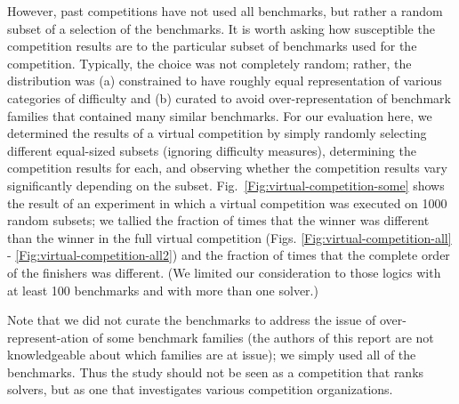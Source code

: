 \documentclass[smallcondensed]{svjour3}
\begin{document}
However, past competitions have not used all benchmarks, but rather a random subset of a selection of the benchmarks. It is worth asking how susceptible the competition results are to the particular subset of benchmarks used for the competition. Typically, the choice was not completely random; rather, the distribution was (a) constrained to have roughly equal representation of various categories of difficulty and (b) curated to avoid over-representation of benchmark families that contained many similar benchmarks. For our evaluation here, we determined the results of a virtual competition by simply randomly selecting different equal-sized subsets (ignoring difficulty measures), determining the competition results for each, and observing whether the competition results vary significantly depending on the subset.  Fig.~\ref{Fig:virtual-competition-some} shows the result of an experiment in which a virtual competition was executed on 1000 random subsets; we tallied the fraction of times that the winner was different than the winner in the full virtual competition (Figs. \ref{Fig:virtual-competition-all} - \ref{Fig:virtual-competition-all2}) and the fraction of times that the complete order of the finishers was different. (We limited our consideration to those logics with at least 100 benchmarks and with more than one solver.)

Note that we did not curate the benchmarks to address the issue of over-represent-ation of some benchmark families (the authors of this report are not knowledgeable about which families are at issue); we simply used all of the benchmarks.  Thus the study should not be seen as a competition that ranks solvers, but as one that investigates various competition organizations.
\end{document}
